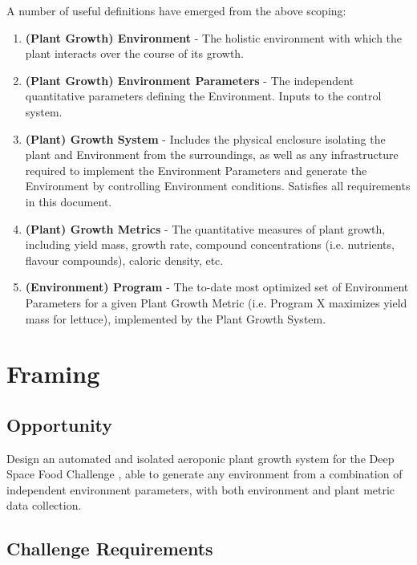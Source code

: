 \documentclass{../tex/report}
\begin{document}
A number of useful definitions have emerged from the above scoping:
\begin{enumerate}
\item \textbf{(Plant Growth) Environment} - The holistic environment with which the plant interacts over the course of its growth.
\item \textbf{(Plant Growth) Environment Parameters} - The independent quantitative parameters defining the Environment. Inputs to the control system.
\item \textbf{(Plant) Growth System} - Includes the physical enclosure isolating the plant and Environment from the surroundings, as well as any infrastructure required to implement the Environment Parameters and generate the Environment by controlling Environment conditions. Satisfies all requirements in this document.
\item \textbf{(Plant) Growth Metrics} - The quantitative measures of plant growth, including yield mass, growth rate, compound concentrations (i.e. nutrients, flavour compounds), caloric density, etc.
\item \textbf{(Environment) Program} - The to-date most optimized set of Environment Parameters for a given Plant Growth Metric (i.e. Program X maximizes yield mass for lettuce), implemented by the Plant Growth System.
\end{enumerate}

\newpage
\section{Framing}
\label{sec:framing}

\subsection{Opportunity}
\label{sec:opportunity}

Design an automated and isolated aeroponic plant growth system for the Deep Space Food Challenge \cite{dsfc}, able to generate any environment from a combination of independent environment parameters, with both environment and plant metric data collection.

\subsection{Challenge Requirements}
\label{sec:requirements}
\end{document}
